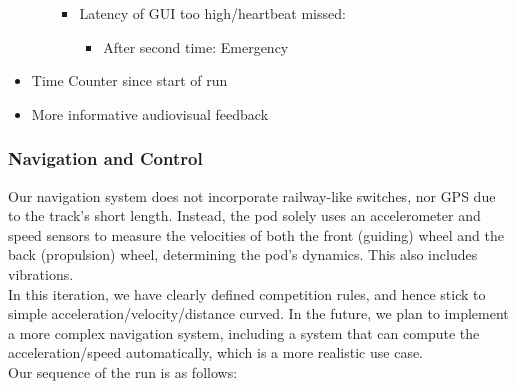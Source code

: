 \begin{itemize}
\begin{itemize}
\begin{itemize}
\begin{itemize}
            \end{itemize}
            \item Latency of GUI too high/heartbeat missed:
            \begin{itemize}
                \item After second time: Emergency 
            \end{itemize}
        \end{itemize}
    \end{itemize}
    \item Time Counter since start of run
    \item More informative audiovisual feedback
\end{itemize} 

\subsubsection*{Navigation and Control}
Our navigation system does not incorporate railway-like switches, nor GPS due to the track's short length. Instead, the pod solely uses an accelerometer and speed sensors to measure the velocities of both the front (guiding) wheel and the back (propulsion) wheel,
determining the pod's dynamics. This also includes vibrations.\\
In this iteration, we have clearly defined competition rules, and hence stick to simple acceleration/velocity/distance curved. In the future, we plan to implement a more complex navigation system, including a system that can compute the acceleration/speed automatically, which is a more realistic use case. \\
Our sequence of the run is as follows:
